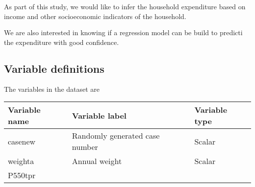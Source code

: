 \documentclass[]{article}
\begin{document}
As part of this study, we would like to infer the household expenditure
based on income and other socioeconomic indicators of the household.

We are also interested in knowing if a regression model can be build to
predicti the expenditure with good confidence.

\hypertarget{variable-definitions}{%
\subsection{Variable definitions}\label{variable-definitions}}

The variables in the dataset are

\begin{longtable}[]{@{}lll@{}}
\toprule
\begin{minipage}[b]{0.14\columnwidth}\raggedright
Variable name\strut
\end{minipage} & \begin{minipage}[b]{0.64\columnwidth}\raggedright
Variable label\strut
\end{minipage} & \begin{minipage}[b]{0.14\columnwidth}\raggedright
Variable type\strut
\end{minipage}\tabularnewline
\midrule
\endhead
\begin{minipage}[t]{0.14\columnwidth}\raggedright
casenew\strut
\end{minipage} & \begin{minipage}[t]{0.64\columnwidth}\raggedright
Randomly generated case number\strut
\end{minipage} & \begin{minipage}[t]{0.14\columnwidth}\raggedright
Scalar\strut
\end{minipage}\tabularnewline
\begin{minipage}[t]{0.14\columnwidth}\raggedright
weighta\strut
\end{minipage} & \begin{minipage}[t]{0.64\columnwidth}\raggedright
Annual weight\strut
\end{minipage} & \begin{minipage}[t]{0.14\columnwidth}\raggedright
Scalar\strut
\end{minipage}\tabularnewline
\begin{minipage}[t]{0.14\columnwidth}\raggedright
P550tpr\strut
\end{minipage} & \begin{minipage}[t]{0.64\columnwidth}\raggedright

\end{minipage}
\end{longtable}
\end{document}
